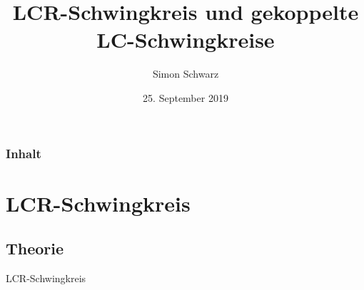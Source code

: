 \documentclass{beamer}
\title[Elektrizitätslehre]{LCR-Schwingkreis und gekoppelte LC-Schwingkreise}
\author{Simon Schwarz}
\institute{Grundpraktikum Physik Teil I}
\date{25. September 2019}
\begin{document}
\begin{frame}
\titlepage
\end{frame}

\begin{frame}
\frametitle{Inhalt}
\tableofcontents
\end{frame}


\section{LCR-Schwingkreis}
\subsection{Theorie}

\begin{frame}
\centering
\Large{LCR-Schwingkreis}
\end{frame}
\end{document}
